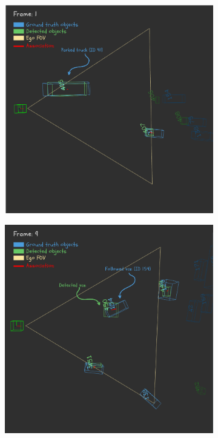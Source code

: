 \begin{figure}[h!]
    \centering
    \begin{subfigure}[b]{0.32\textwidth}
        \includegraphics[width=\linewidth]{images/experiments/evaluation_frames/3d_evaluation_frame_1_canva.png}
        \caption{}
        \label{fig:scene_open3d_cases_a}
    \end{subfigure}
    \hfill
    \begin{subfigure}[b]{0.32\textwidth}
        \includegraphics[width=\textwidth]{images/experiments/evaluation_frames/3d_evaluation_frame_9_canva.png}

\end{subfigure}
\end{figure}
